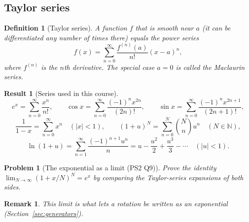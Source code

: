 \documentclass{article}
\newtheorem{definition}{Definition}
\newtheorem{problem}{Problem}
\newtheorem{remark}{Remark}
\newtheorem{result}{Result}
\begin{document}
\subsection{Taylor series}
\begin{definition}[Taylor series]
    A function $f$ that is smooth near $a$ (it can be differentiated any number of times there) equals the power series
    \begin{equation}
        f(x) = \sum_{n=0}^{\infty}\frac{f^{(n)}(a)}{n!}(x-a)^n,
    \end{equation}
    where $f^{(n)}$ is the $n$th derivative. The special case $a = 0$ is called the Maclaurin series.
\end{definition}
\begin{result}[Series used in this course]
    \begin{equation}
        e^{x} = \sum_{n=0}^{\infty}\frac{x^n}{n!}, \qquad
        \cos x = \sum_{n=0}^{\infty}\frac{(-1)^n x^{2n}}{(2n)!}, \qquad
        \sin x = \sum_{n=0}^{\infty}\frac{(-1)^n x^{2n+1}}{(2n+1)!},
    \end{equation}
    \begin{equation}
        \frac{1}{1-x} = \sum_{n=0}^{\infty}x^n \quad (|x|<1), \qquad (1+u)^N = \sum_{n=0}^{N}\binom{N}{n}u^n \quad (N \in \mathbb{N}),
    \end{equation}
    \begin{equation}
        \ln(1+u) = \sum_{n=1}^{\infty}\frac{(-1)^{n+1}u^n}{n} = u - \frac{u^2}{2} + \frac{u^3}{3} - \cdots \quad (|u|<1).
    \end{equation}
\end{result}
\begin{problem}[The exponential as a limit (PS2 Q9)]
    Prove the identity $\lim_{N\to\infty}\left(1+x/N\right)^N = e^x$ by comparing the Taylor-series expansions of both sides.
\end{problem}
\begin{remark}
    This limit is what lets a rotation be written as an exponential (Section~\ref{sec:generators}).
\end{remark}
\end{document}
